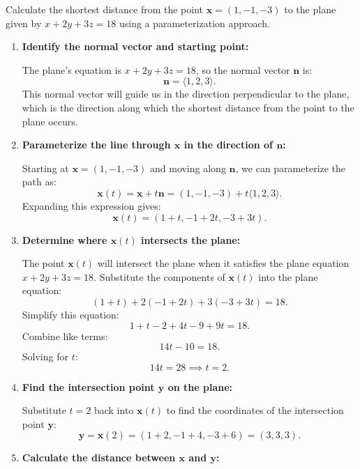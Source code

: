 \exampleline
\begin{example}
Calculate the shortest distance from the point \( \mathbf{x} = (1, -1, -3) \) to the plane given by \( x + 2y + 3z = 18 \) using a parameterization approach.

\begin{solution}

\begin{enumerate}
    \item \textbf{Identify the normal vector and starting point:}
    
    \noindent The plane's equation is \( x + 2y + 3z = 18 \), so the normal vector \( \mathbf{n} \) is:
    \[
    \mathbf{n} = \langle 1, 2, 3 \rangle.
    \]
    This normal vector will guide us in the direction perpendicular to the plane, which is the direction along which the shortest distance from the point to the plane occurs.

    \item \textbf{Parameterize the line through \( \mathbf{x} \) in the direction of \( \mathbf{n} \):}
    
    \noindent Starting at \( \mathbf{x} = (1, -1, -3) \) and moving along \( \mathbf{n} \), we can parameterize the path as:
    \[
    \mathbf{x}(t) = \mathbf{x} + t \mathbf{n} = (1, -1, -3) + t \langle 1, 2, 3 \rangle.
    \]
    Expanding this expression gives:
    \[
    \mathbf{x}(t) = (1 + t, -1 + 2t, -3 + 3t).
    \]

    \item \textbf{Determine where \( \mathbf{x}(t) \) intersects the plane:}
    
    \noindent The point \( \mathbf{x}(t) \) will intersect the plane when it satisfies the plane equation \( x + 2y + 3z = 18 \). Substitute the components of \( \mathbf{x}(t) \) into the plane equation:
    \[
    (1 + t) + 2(-1 + 2t) + 3(-3 + 3t) = 18.
    \]
    Simplify this equation:
    \[
    1 + t - 2 + 4t - 9 + 9t = 18.
    \]
    Combine like terms:
    \[
    14t - 10 = 18.
    \]
    Solving for \( t \):
    \[
    14t = 28 \implies t = 2.
    \]

    \item \textbf{Find the intersection point \( \mathbf{y} \) on the plane:}
    
    \noindent Substitute \( t = 2 \) back into \( \mathbf{x}(t) \) to find the coordinates of the intersection point \( \mathbf{y} \):
    \[
    \mathbf{y} = \mathbf{x}(2) = (1 + 2, -1 + 4, -3 + 6) = (3, 3, 3).
    \]

    \item \textbf{Calculate the distance between \( \mathbf{x} \) and \( \mathbf{y} \):}
    

\end{enumerate}
\end{solution}
\end{example}
